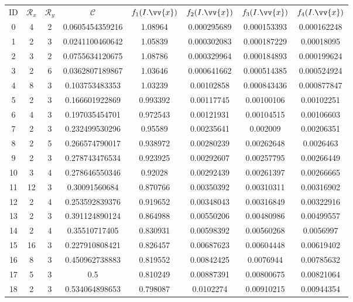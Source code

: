 \scriptsize
\begin{longtable}{|c|c|c|c|c|c|c|c|}
\hline
ID & $\mathscr{R}_x$ & $\mathscr{R}_y$ & $\mathscr{C}$ & $f_1(I.\vv{x})$ & $f_2(I.\vv{x})$ & $f_3(I.\vv{x})$ & $f_4(I.\vv{x})$ \\
0 & 4 & 2 & 0.0605454359216 & 1.08964 & 0.000295689 & 0.000153393 & 0.000162248 \\
1 & 2 & 3 & 0.0241100460642 & 1.05839 & 0.000302083 & 0.000187229 & 0.00018095 \\
2 & 3 & 2 & 0.0755634120675 & 1.08786 & 0.000329964 & 0.000184893 & 0.000199624 \\
3 & 2 & 6 & 0.0362807189867 & 1.03646 & 0.000641662 & 0.000514385 & 0.000524924 \\
4 & 8 & 3 & 0.103753483353 & 1.03239 & 0.00102858 & 0.000843436 & 0.000877847 \\
5 & 2 & 3 & 0.166601922869 & 0.993392 & 0.00117745 & 0.00100106 & 0.00102251 \\
6 & 4 & 3 & 0.197035454701 & 0.972543 & 0.00121931 & 0.00104515 & 0.00106603 \\
7 & 2 & 3 & 0.232499530296 & 0.95589 & 0.00235641 & 0.002009 & 0.00206351 \\
8 & 2 & 5 & 0.266574790017 & 0.938972 & 0.00280239 & 0.00262648 & 0.0026463 \\
9 & 2 & 3 & 0.278743476534 & 0.923925 & 0.00292607 & 0.00257795 & 0.00266449 \\
10 & 3 & 4 & 0.278646550346 & 0.92028 & 0.00292439 & 0.00261397 & 0.00266665 \\
11 & 12 & 3 & 0.30091560684 & 0.870766 & 0.00350392 & 0.00310311 & 0.00316902 \\
12 & 2 & 4 & 0.253592839376 & 0.919652 & 0.00348043 & 0.00316849 & 0.00322916 \\
13 & 2 & 3 & 0.391124890124 & 0.864988 & 0.00550206 & 0.00480986 & 0.00499557 \\
14 & 2 & 4 & 0.35510717405 & 0.830931 & 0.00598392 & 0.00560268 & 0.0056997 \\
15 & 16 & 3 & 0.227910808421 & 0.826457 & 0.00687623 & 0.00604448 & 0.00619402 \\
16 & 8 & 3 & 0.450962738883 & 0.819552 & 0.00842425 & 0.0076944 & 0.00785632 \\
17 & 5 & 3 & 0.5 & 0.810249 & 0.00887391 & 0.00800675 & 0.00821064 \\
18 & 2 & 3 & 0.534064898653 & 0.798087 & 0.0102274 & 0.00910215 & 0.00944354 \\

\end{longtable}
